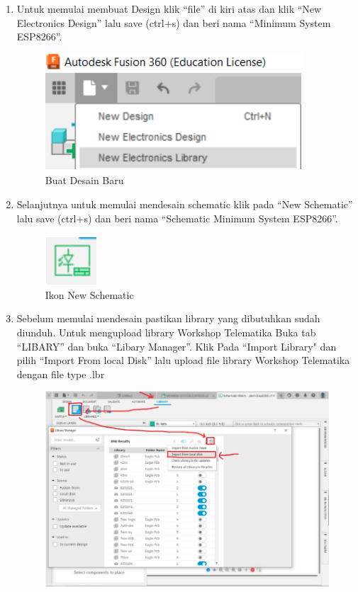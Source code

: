 \begin{enumerate}
    \item Untuk memulai membuat Design klik “file” di kiri atas dan klik “New Electronics Design”
    lalu save (ctrl+s) dan beri nama “Minimum System ESP8266”.
        \begin{figure}[H]
            \centering
            \includegraphics[width=0.6\linewidth]{P1/img/newelect.png}
            \caption{Buat Desain Baru} 
            \label{fig:buatdesainbaru}
        \end{figure}
    \item Selanjutnya untuk memulai mendesain schematic klik pada “New Schematic” lalu
    save (ctrl+s) dan beri nama “Schematic Minimum System ESP8266”.
        \begin{figure}[H]
            \centering
            \includegraphics[width=0.16\linewidth]{P1/img/newschematic.png}
            \caption{Ikon New Schematic} 
            \label{fig:ikonnewschematic}
        \end{figure}
    \item Sebelum memulai mendesain pastikan library yang dibutuhkan sudah diunduh. Untuk
    mengupload library Workshop Telematika Buka tab “LIBARY” dan buka “Libary Manager”.
    Klik Pada “Import Library" dan pilih “Import From local Disk” lalu upload file library
    Workshop Telematika dengan file type .lbr
        \begin{figure}[H]
            \centering
            \includegraphics[width=0.7\linewidth]{P1/img/importLibrary.png}

\end{figure}
\end{enumerate}
